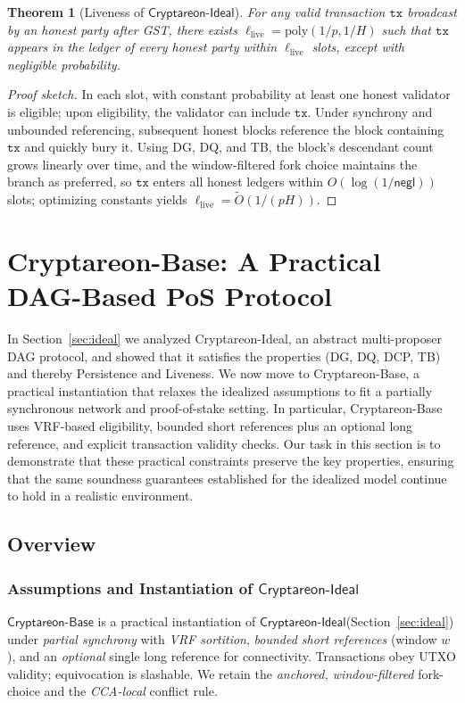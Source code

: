 \documentclass[11pt]{article}
\newtheorem{theorem}{Theorem}[section]
\newcommand{\ProjIdeal}{\ensuremath{\mathsf{Cryptareon\text{-}Ideal}}\xspace}
\newcommand{\ProjBase}{\ensuremath{\mathsf{Cryptareon\text{-}Base}}\xspace}
\newcommand{\negl}{\ensuremath{\mathsf{negl}}\xspace}
\newcommand{\tx}{\ensuremath{\mathtt{tx}}\xspace}
\begin{document}
\begin{theorem}[Liveness of \ProjIdeal]
\label{thm:ideal-liveness}
For any valid transaction $\tx$ broadcast by an honest party after GST, there exists $\ell_{\mathrm{live}}=\mathrm{poly}(1/p,1/H)$ such that $\tx$ appears in the ledger of every honest party within $\ell_{\mathrm{live}}$ slots, except with negligible probability.
\end{theorem}
\begin{proof}[Proof sketch]
In each slot, with constant probability at least one honest validator is eligible; upon eligibility, the validator can include $\tx$. Under synchrony and unbounded referencing, subsequent honest blocks reference the block containing $\tx$ and quickly bury it. Using DG, DQ, and TB, the block's descendant count grows linearly over time, and the window-filtered fork choice maintains the branch as preferred, so $\tx$ enters all honest ledgers within $O(\log(1/\negl))$ slots; optimizing constants yields $\ell_{\mathrm{live}}=\tilde{O}(1/(pH))$.
\end{proof}

\section{Cryptareon-Base: A Practical DAG-Based PoS Protocol}
\label{sec:base}
In Section~\ref{sec:ideal} we analyzed Cryptareon-Ideal, an abstract multi-proposer DAG protocol, and showed
that it satisfies the properties (DG, DQ, DCP, TB) and thereby Persistence and Liveness. We now
move to Cryptareon-Base, a practical instantiation that relaxes the idealized assumptions to fit
a partially synchronous network and proof-of-stake setting. In particular, Cryptareon-Base uses
VRF-based eligibility, bounded short references plus an optional long reference, and explicit
transaction validity checks. Our task in this section is to demonstrate that these practical
constraints preserve the key properties, ensuring that the same soundness guarantees established
for the idealized model continue to hold in a realistic environment.

\subsection{Overview}

\subsubsection{Assumptions and Instantiation of \ProjIdeal}
\label{subsec:base-overview}
\ProjBase is a practical instantiation of \ProjIdeal (Section~\ref{sec:ideal}) under \emph{partial synchrony} with \emph{VRF sortition}, \emph{bounded short references} (window $w$), and an \emph{optional} single long reference for connectivity. Transactions obey UTXO validity; equivocation is slashable. We retain the \emph{anchored, window-filtered} fork-choice and the \emph{CCA-local} conflict rule.
\end{document}
